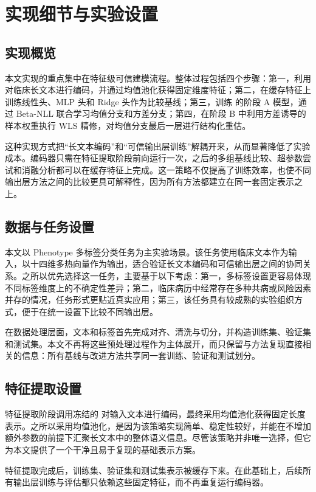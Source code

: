 \section{实现细节与实验设置}
\subsection{实现概览}
本文实现的重点集中在特征级可信建模流程。整体过程包括四个步骤：第一，利用 \encoder{} 对临床长文本进行编码，并通过均值池化获得固定维度特征；第二，在缓存特征上训练线性头、MLP 头和 Ridge 头作为比较基线；第三，训练 \method{} 的阶段 A 模型，通过 Beta-NLL 联合学习均值分支和方差分支；第四，在阶段 B 中利用方差诱导的样本权重执行 WLS 精修，对均值分支最后一层进行结构化重估。

这种实现方式把“长文本编码”和“可信输出层训练”解耦开来，从而显著降低了实验成本。编码器只需在特征提取阶段前向运行一次，之后的多组基线比较、超参数尝试和消融分析都可以在缓存特征上完成。这一策略不仅提高了训练效率，也使不同输出层方法之间的比较更具可解释性，因为所有方法都建立在同一套固定表示之上。

\subsection{数据与任务设置}
本文以 Phenotype 多标签分类任务为主实验场景。该任务使用临床文本作为输入，以十四维多热向量作为输出，适合验证长文本编码和可信输出层之间的协同关系。之所以优先选择这一任务，主要基于以下考虑：第一，多标签设置更容易体现不同标签维度上的不确定性差异；第二，临床病历中经常存在多种共病或风险因素并存的情况，任务形式更贴近真实应用；第三，该任务具有较成熟的实验组织方式，便于在统一设置下比较不同输出层。

在数据处理层面，文本和标签首先完成对齐、清洗与切分，并构造训练集、验证集和测试集。本文不再将这些预处理过程作为主体展开，而只保留与方法复现直接相关的信息：所有基线与改进方法共享同一套训练、验证和测试划分。

\subsection{特征提取设置}
特征提取阶段调用冻结的 \encoder{} 对输入文本进行编码，最终采用均值池化获得固定长度表示。之所以采用均值池化，是因为该策略实现简单、稳定性较好，并能在不增加额外参数的前提下汇聚长文本中的整体语义信息。尽管该策略并非唯一选择，但它为本文提供了一个干净且易于复现的基础表示方案。

特征提取完成后，训练集、验证集和测试集表示被缓存下来。在此基础上，后续所有输出层训练与评估都只依赖这些固定特征，而不再重复运行编码器。

